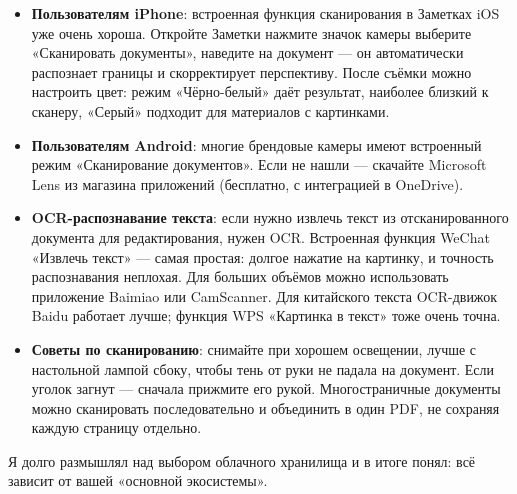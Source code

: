 \begin{itemize}
  \item \textbf{Пользователям iPhone}: встроенная функция сканирования в Заметках iOS уже очень хороша. Откройте Заметки нажмите значок камеры выберите «Сканировать документы», наведите на документ — он автоматически распознает границы и скорректирует перспективу. После съёмки можно настроить цвет: режим «Чёрно-белый» даёт результат, наиболее близкий к сканеру, «Серый» подходит для материалов с картинками.
  \item \textbf{Пользователям Android}: многие брендовые камеры имеют встроенный режим «Сканирование документов». Если не нашли — скачайте Microsoft Lens из магазина приложений (бесплатно, с интеграцией в OneDrive).
  \item \textbf{OCR-распознавание текста}: если нужно извлечь текст из отсканированного документа для редактирования, нужен OCR. Встроенная функция WeChat «Извлечь текст» — самая простая: долгое нажатие на картинку, и точность распознавания неплохая. Для больших объёмов можно использовать приложение Baimiao или CamScanner. Для китайского текста OCR-движок Baidu работает лучше; функция WPS «Картинка в текст» тоже очень точна.
  \item \textbf{Советы по сканированию}: снимайте при хорошем освещении, лучше с настольной лампой сбоку, чтобы тень от руки не падала на документ. Если уголок загнут — сначала прижмите его рукой. Многостраничные документы можно сканировать последовательно и объединить в один PDF, не сохраняя каждую страницу отдельно.
\end{itemize}


Я долго размышлял над выбором облачного хранилища и в итоге понял: всё зависит от вашей «основной экосистемы».

